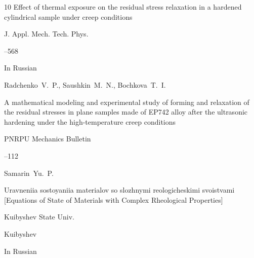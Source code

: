 \begin{thebibliography}{10}
\paper Effect of thermal exposure on the residual stress relaxation in a hardened cylindrical sample under creep conditions

\jour J. Appl. Mech. Tech. Phys.




--568







\lang In Russian

\by Radchenko~V.~P., Saushkin~M.~N., Bochkova~T.~I.

\paper A mathematical modeling and experimental study of forming and relaxation of the residual stresses in plane samples made of EP742 alloy after the ultrasonic hardening under the high-temperature creep conditions

\jour PNRPU Mechanics Bulletin



--112





\by Samarin~Yu.~P.

\book Uravneniia sostoyaniia materialov so slozhnymi reologicheskimi svoistvami \rm [Equations of State of Materials with Complex Rheological Properties]


\publ Kuibyshev State Univ.

\publaddr Kuibyshev

\lang In Russian











\end{thebibliography}
